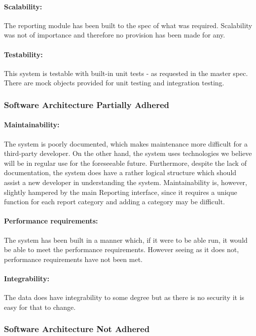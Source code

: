 \documentclass{article}
\begin{document}
            \paragraph{Scalability:}
            The reporting module has been built to the spec of what was required. Scalability was not of importance and therefore no provision has been made for any.
            \paragraph{Testability:}
            This system is testable with built-in unit tests - as requested in the master spec. There are mock objects provided for unit testing and integration testing.
        \subsubsection{Software Architecture Partially Adhered}
        	\paragraph{Maintainability:}
            The system is poorly documented, which makes maintenance more difficult for a third-party developer. On the other hand, the system uses technologies we believe will be in regular use for the foreseeable future. Furthermore, despite the lack of documentation, the system does have a rather logical structure which should assist a new developer in understanding the system. Maintainability is, however, slightly hampered by the main Reporting interface, since it requires a unique function for each report category and adding a category may be difficult.
			\paragraph{Performance requirements:}
            The system has been built in a manner which, if it were to be able run, it would be able to meet the performance requirements. However seeing as it does not, performance requirements have not been met.
            \paragraph{Integrability:}
            The data does have integrability to some degree but as there is no security it is easy for that to change.
        \subsubsection{Software Architecture Not Adhered}
\end{document}
